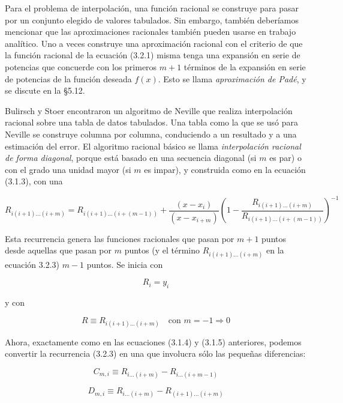 \documentclass[10pt,a4paper]{book}
\begin{document}
Para el problema de interpolación, una función racional se construye para pasar por un conjunto elegido de valores tabulados. Sin embargo, también deberíamos mencionar que las aproximaciones racionales también pueden usarse en trabajo analítico. Uno a veces construye una aproximación racional con el criterio de que la función racional de la ecuación (3.2.1) misma tenga una expansión en serie de potencias que concuerde con los primeros $m+1$ términos de la expansión en serie de potencias de la función deseada $f(x)$. Esto se llama \emph{aproximación de Padé}, y se discute en la \S5.12.

Bulirsch y Stoer encontraron un algoritmo de Neville que realiza interpolación racional sobre una tabla de datos tabulados. Una tabla como la que se usó para Neville se construye columna por columna, conduciendo a un resultado y a una estimación del error. El algoritmo racional básico se llama \emph{interpolación racional de forma diagonal}, porque está basado en una secuencia diagonal (si $m$ es par) o con el grado una unidad mayor (si $m$ es impar), y construida como en la ecuación (3.1.3), con una

\begin{equation}
R_{i(i+1)\ldots(i+m)} = R_{i(i+1)\ldots(i+(m-1))} + \frac{(x - x_i)}{(x - x_{i+m})} \left(1 - \frac{R_{i(i+1)\ldots(i+m)}}{R_{i(i+1)\ldots(i+(m-1))}} \right)^{-1}
\end{equation}

Esta recurrencia genera las funciones racionales que pasan por $m+1$ puntos desde aquellas que pasan por $m$ puntos (y el término $R_{i(i+1)\ldots(i+m)}$ en la ecuación 3.2.3) $m-1$ puntos. Se inicia con

\begin{equation}
R_i = y_i
\end{equation}

y con

\begin{equation}
R \equiv R_{i(i+1)\ldots(i+m)} \quad \text{con } m = -1 \Rightarrow 0
\end{equation}

Ahora, exactamente como en las ecuaciones (3.1.4) y (3.1.5) anteriores, podemos convertir la recurrencia (3.2.3) en una que involucra sólo las pequeñas diferencias:

\begin{equation}
C_{m,i} \equiv R_{i\ldots(i+m)} - R_{i\ldots(i+m-1)}
\end{equation}

\begin{equation}
D_{m,i} \equiv R_{i\ldots(i+m)} - R_{(i+1)\ldots(i+m)}
\end{equation}
\end{document}
